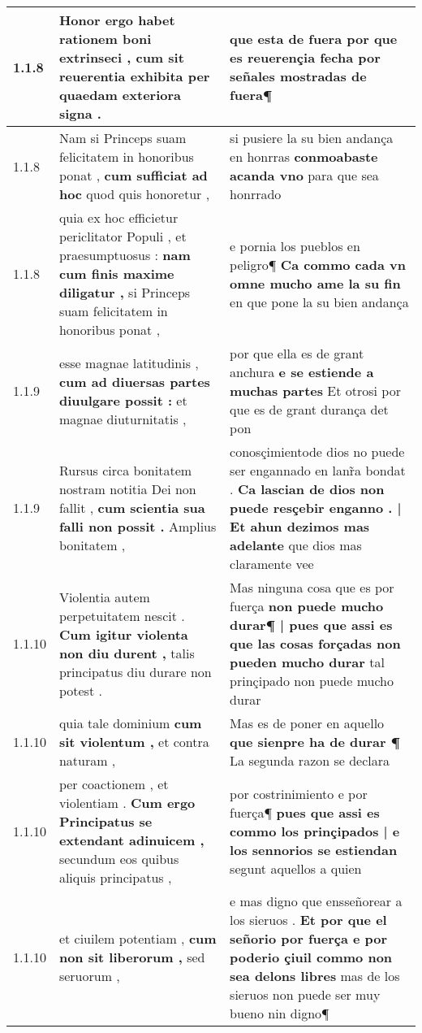 \begin{tabular}{|p{1cm}|p{6.5cm}|p{6.5cm}|}
1.1.8 & Honor ergo habet rationem boni extrinseci , \textbf{ cum sit reuerentia exhibita } per quaedam exteriora signa . & que esta de fuera \textbf{ por que es reuerençia fecha } por señales mostradas de fuera¶ \\\hline
1.1.8 & Nam si Princeps suam felicitatem in honoribus ponat , \textbf{ cum sufficiat ad hoc } quod quis honoretur , & si pusiere la su bien andança en honrras \textbf{ conmoabaste acanda vno } para que sea honrrado \\\hline
1.1.8 & quia ex hoc efficietur periclitator Populi , et praesumptuosus : \textbf{ nam cum finis maxime diligatur , } si Princeps suam felicitatem in honoribus ponat , & e pornia los pueblos en peligro¶ \textbf{ Ca commo cada vn omne mucho ame la su fin } en que pone la su bien andança \\\hline
1.1.9 & esse magnae latitudinis , \textbf{ cum ad diuersas partes diuulgare possit : } et magnae diuturnitatis , & por que ella es de grant anchura \textbf{ e se estiende a muchas partes } Et otrosi por que es de grant durança det pon \\\hline
1.1.9 & Rursus circa bonitatem nostram notitia Dei non fallit , \textbf{ cum scientia sua falli non possit . } Amplius bonitatem , & conosçimientode dios no puede ser engannado en lanr̃a bondat . \textbf{ Ca lascian de dios non puede resçebir enganno . | Et ahun dezimos mas adelante } que dios mas claramente vee \\\hline
1.1.10 & Violentia autem perpetuitatem nescit . \textbf{ Cum igitur violenta non diu durent , } talis principatus diu durare non potest . & Mas ninguna cosa que es por fuerça \textbf{ non puede mucho durar¶ | pues que assi es que las cosas forçadas non pueden mucho durar } tal prinçipado non puede mucho durar \\\hline
1.1.10 & quia tale dominium \textbf{ cum sit violentum , } et contra naturam , & Mas es de poner en aquello \textbf{ que sienpre ha de durar ¶ } La segunda razon se declara \\\hline
1.1.10 & per coactionem , et violentiam . \textbf{ Cum ergo Principatus se extendant adinuicem , } secundum eos quibus aliquis principatus , & por costrinimiento e por fuerça¶ \textbf{ pues que assi es commo los prinçipados | e los sennorios se estiendan } segunt aquellos a quien \\\hline
1.1.10 & et ciuilem potentiam , \textbf{ cum non sit liberorum , } sed seruorum , & e mas digno que ensseñorear a los sieruos . \textbf{ Et por que el señorio por fuerça e por poderio çiuil commo non sea delons libres } mas de los sieruos non puede ser muy bueno nin digno¶ \\\hline

\end{tabular}
